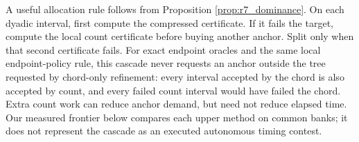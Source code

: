 A useful allocation rule follows from Proposition \ref{prop:r7_dominance}. On each dyadic interval, first compute the compressed certificate. If it fails the target, compute the local count certificate before buying another anchor. Split only when that second certificate fails. For exact endpoint oracles and the same local endpoint-policy rule, this cascade never requests an anchor outside the tree requested by chord-only refinement: every interval accepted by the chord is also accepted by count, and every failed count interval would have failed the chord. Extra count work can reduce anchor demand, but need not reduce elapsed time. Our measured frontier below compares each upper method on common banks; it does not represent the cascade as an executed autonomous timing contest.
